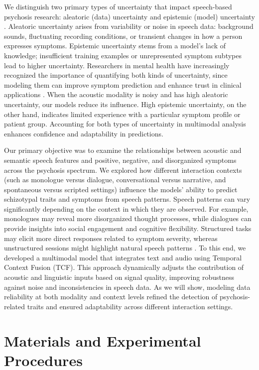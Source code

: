 \documentclass[9pt,a4paper]{rho-class/rho}
\begin{document}
We distinguish two primary types of uncertainty that impact speech-based psychosis research: aleatoric (data) uncertainty and epistemic (model) uncertainty \cite{kendall2017uncertainties}. Aleatoric uncertainty arises from variability or noise in speech data: background sounds, fluctuating recording conditions, or transient changes in how a person expresses symptoms. Epistemic uncertainty stems from a model’s lack of knowledge; insufficient training examples or unrepresented symptom subtypes lead to higher uncertainty. Researchers in mental health have increasingly recognized the importance of quantifying both kinds of uncertainty, since modeling them can improve symptom prediction and enhance trust in clinical applications \cite{kompa2021second,popat2023embracing,kang2024cure}. When the acoustic modality is noisy and has high aleatoric uncertainty, our models reduce its influence. High epistemic uncertainty, on the other hand, indicates limited experience with a particular symptom profile or patient group. Accounting for both types of uncertainty in multimodal analysis enhances confidence and adaptability in predictions.

Our primary objective was to examine the relationships between acoustic and semantic speech features and positive, negative, and disorganized symptoms across the psychosis spectrum. We explored how different interaction contexts (such as monologue versus dialogue, conversational versus narrative, and spontaneous versus scripted settings) influence the models' ability to predict schizotypal traits and symptoms from speech patterns. Speech patterns can vary significantly depending on the context in which they are observed. For example, monologues may reveal more disorganized thought processes, while dialogues can provide insights into social engagement and cognitive flexibility. Structured tasks may elicit more direct responses related to symptom severity, whereas unstructured sessions might highlight natural speech patterns \cite{de2020artificial}.
To this end, we developed a multimodal model that integrates text and audio using Temporal Context Fusion (TCF). This approach dynamically adjusts the contribution of acoustic and linguistic inputs based on signal quality, improving robustness against noise and inconsistencies in speech data. As we will show, modeling data reliability at both modality and context levels refined the detection of psychosis-related traits and ensured adaptability across different interaction settings.


\section{Materials and Experimental Procedures}
\end{document}
